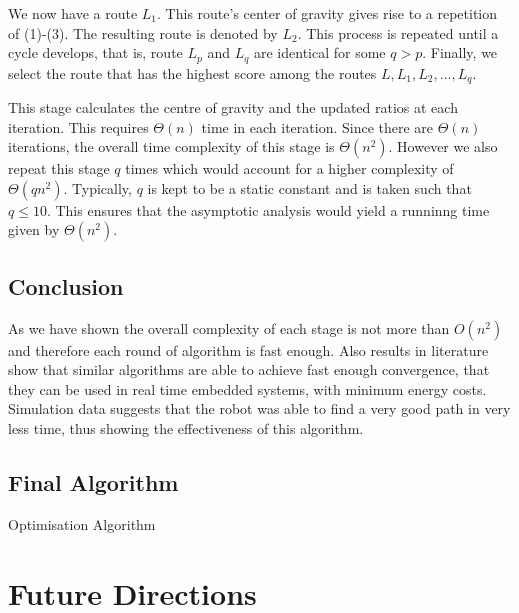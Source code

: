 \documentclass{article}
\begin{document}
We now have a route $L_1$. This route’s center of gravity gives rise to a repetition
of (1)-(3). The resulting route is denoted by $L_2$. This process is repeated until
a cycle develops, that is, route $L_p$ and $L_q$ are identical for some $q > p$. Finally,
we select the route that has the highest score among the routes
${L, L_1, L_2 , \ldots , L_q}$. 

This stage calculates the centre of gravity and the updated ratios at each iteration. This requires $\Theta(n)$ time in each iteration. Since there are $\Theta(n)$ iterations, the overall
time complexity of this stage is $\Theta(n^2)$. However we also repeat this stage $q$ times which would account for a higher complexity of $\Theta(qn^2)$. Typically,
$q$ is kept to be a static constant and is taken such that $q \le 10$. This ensures that the asymptotic analysis would yield a runninng time
given by $\Theta(n^2)$.
\subsection{Conclusion}

As we have shown the overall complexity of each stage is not more than $O(n^2)$ and therefore each round of algorithm is fast enough.
Also results in literature show that similar algorithms are able to achieve fast enough convergence, that they can be used in real time embedded systems, with minimum energy costs. \cite{RAMESH1991151}
Simulation data suggests that the robot was able to find a very good path in very less time, thus showing the effectiveness of this algorithm.

\subsection{Final Algorithm}

\begin{algorithm}[H]
    \SetAlgoLined
    \caption{Optimisation Algorithm}
\end{algorithm}



\section{Future Directions}
\end{document}
